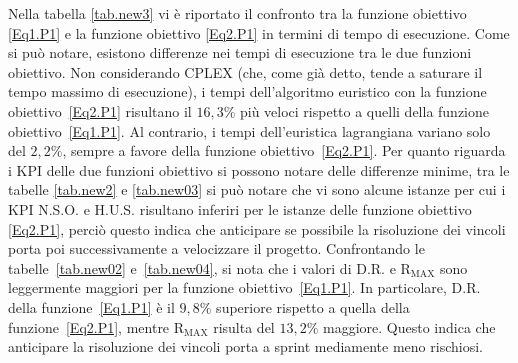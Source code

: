 \documentclass[12pt,a4paper,openright,twoside]{book}
\begin{document}
Nella tabella \ref{tab.new3} vi \`e riportato il confronto tra la funzione obiettivo \eqref{Eq1.P1} e la funzione obiettivo \eqref{Eq2.P1} in termini di tempo di esecuzione. Come si può notare, esistono differenze nei tempi di esecuzione tra le due funzioni obiettivo. Non considerando CPLEX (che, come già detto, tende a saturare il tempo massimo di esecuzione), i tempi dell'algoritmo euristico con la funzione obiettivo~\eqref{Eq2.P1} risultano il $16{,}3\%$ più veloci rispetto a quelli della funzione obiettivo~\eqref{Eq1.P1}. Al contrario, i tempi dell'euristica lagrangiana variano solo del $2{,}2\%$, sempre a favore della funzione obiettivo~\eqref{Eq2.P1}.
Per quanto riguarda i KPI delle due funzioni obiettivo si possono notare delle differenze minime, tra le tabelle \ref{tab.new2} e \ref{tab.new03} si può notare che vi sono alcune istanze per cui i KPI N.S.O. e H.U.S. risultano inferiri per le istanze delle funzione obiettivo \eqref{Eq2.P1}, perciò questo indica che anticipare se possibile la risoluzione dei vincoli porta poi successivamente a velocizzare il progetto.
Confrontando le tabelle~\ref{tab.new02} e~\ref{tab.new04}, si nota che i valori di D.R. e R$_{\text{MAX}}$ sono leggermente maggiori per la funzione obiettivo~\eqref{Eq1.P1}. In particolare, D.R. della funzione~\eqref{Eq1.P1} è il $9{,}8\%$ superiore rispetto a quella della funzione~\eqref{Eq2.P1}, mentre R$_{\text{MAX}}$ risulta del $13{,}2\%$ maggiore. Questo indica che anticipare la risoluzione dei vincoli porta a sprint mediamente meno rischiosi.
\end{document}
